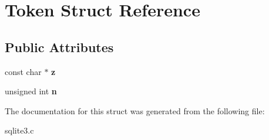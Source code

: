\hypertarget{structToken}{}\section{Token Struct Reference}
\label{structToken}
\subsection*{Public Attributes}
\begin{DoxyCompactItemize}
\item 
const char $\ast$ {\bfseries z}\hypertarget{structToken_a57b502141e3018e4a02773424acb4ffd}{}\label{structToken_a57b502141e3018e4a02773424acb4ffd}

\item 
unsigned int {\bfseries n}\hypertarget{structToken_ad8442439e00ab9713a9b91a53e44c2aa}{}\label{structToken_ad8442439e00ab9713a9b91a53e44c2aa}

\end{DoxyCompactItemize}


The documentation for this struct was generated from the following file\+:\begin{DoxyCompactItemize}
\item 
sqlite3.\+c\end{DoxyCompactItemize}
